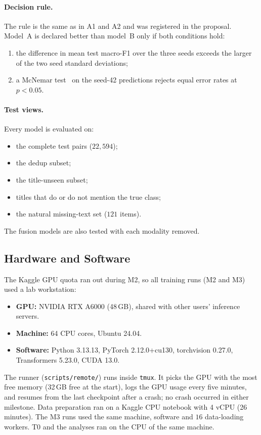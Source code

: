\paragraph{Decision rule.}
The rule is the same as in A1 and A2 and was registered in the proposal. Model~A is declared better than model~B
only if both conditions hold:
\begin{enumerate}
  \item the difference in mean test macro-F1 over the three seeds exceeds the larger of the two seed standard deviations;
  \item a McNemar test~\cite{mcnemar1947} on the seed-42 predictions rejects equal error rates at $p<0.05$.
\end{enumerate}

\paragraph{Test views.}
Every model is evaluated on:
\begin{itemize}
  \item the complete test pairs ($22{,}594$);
  \item the dedup subset;
  \item the title-unseen subset;
  \item titles that do or do not mention the true class;
  \item the natural missing-text set ($121$ items).
\end{itemize}
The fusion models are also tested with each modality removed.

\subsection{Hardware and Software}
\label{sec:hardware}

The Kaggle GPU quota ran out during M2, so all training runs (M2 and M3) used a lab workstation:
\begin{itemize}
  \item \textbf{GPU:} NVIDIA RTX A6000 (48\,GB), shared with other users' inference servers.
  \item \textbf{Machine:} 64 CPU cores, Ubuntu 24.04.
  \item \textbf{Software:} Python 3.13.13, PyTorch 2.12.0+cu130, torchvision 0.27.0, Transformers 5.23.0, CUDA 13.0.
\end{itemize}
The runner (\texttt{scripts/remote/}) runs inside \texttt{tmux}. It picks the GPU with the most free memory
(32\,GB free at the start), logs the GPU usage every five minutes, and resumes from the last checkpoint after a
crash; no crash occurred in either milestone. Data preparation ran on a Kaggle CPU notebook with 4 vCPU
(26 minutes). The M3 runs used the same machine, software and $16$ data-loading workers. T0 and the analyses ran
on the CPU of the same machine.
